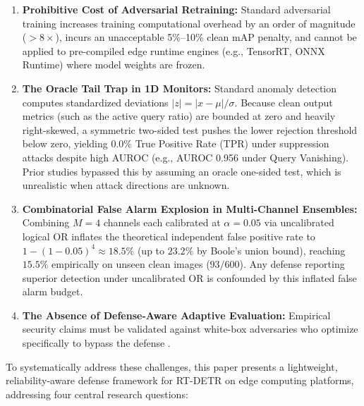 \documentclass[preprint,12pt]{elsarticle}
\begin{document}
\begin{enumerate}
    \item \textbf{Prohibitive Cost of Adversarial Retraining:} Standard adversarial training \citep{madry2017towards, zhang2019theoretically} increases training computational overhead by an order of magnitude ($>8\times$), incurs an unacceptable 5\%--10\% clean mAP penalty, and cannot be applied to pre-compiled edge runtime engines (e.g., TensorRT, ONNX Runtime) where model weights are frozen.
    \item \textbf{The Oracle Tail Trap in 1D Monitors:} Standard anomaly detection computes standardized deviations $|z| = |x - \mu|/\sigma$. Because clean output metrics (such as the active query ratio) are bounded at zero and heavily right-skewed, a symmetric two-sided test pushes the lower rejection threshold below zero, yielding 0.0\% True Positive Rate (TPR) under suppression attacks despite high AUROC (e.g., AUROC 0.956 under Query Vanishing). Prior studies bypassed this by assuming an oracle one-sided test, which is unrealistic when attack directions are unknown.
    \item \textbf{Combinatorial False Alarm Explosion in Multi-Channel Ensembles:} Combining $M=4$ channels each calibrated at $\alpha = 0.05$ via uncalibrated logical OR inflates the theoretical independent false positive rate to $1 - (1 - 0.05)^4 \approx 18.5\%$ (up to $23.2\%$ by Boole's union bound), reaching $15.5\%$ empirically on unseen clean images ($93/600$). Any defense reporting superior detection under uncalibrated OR is confounded by this inflated false alarm budget.
    \item \textbf{The Absence of Defense-Aware Adaptive Evaluation:} Empirical security claims must be validated against white-box adversaries who optimize specifically to bypass the defense \citep{carlini2019evaluating, tramer2020adaptive}.
\end{enumerate}

To systematically address these challenges, this paper presents a lightweight, reliability-aware defense framework for RT-DETR on edge computing platforms, addressing four central research questions:
\end{document}
